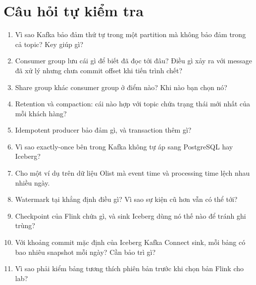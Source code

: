 \section{Câu hỏi tự kiểm tra}
\begin{enumerate}
  \item Vì sao Kafka bảo đảm thứ tự trong một partition mà không bảo đảm trong cả topic? Key giúp gì?
  \item Consumer group lưu cái gì để biết đã đọc tới đâu? Điều gì xảy ra với message đã xử lý nhưng chưa commit offset khi tiến trình chết?
  \item Share group khác consumer group ở điểm nào? Khi nào bạn chọn nó?
  \item Retention và compaction: cái nào hợp với topic chứa trạng thái mới nhất của mỗi khách hàng?
  \item Idempotent producer bảo đảm gì, và transaction thêm gì?
  \item Vì sao exactly-once bên trong Kafka không tự áp sang PostgreSQL hay Iceberg?
  \item Cho một ví dụ trên dữ liệu Olist mà event time và processing time lệch nhau nhiều ngày.
  \item Watermark tại  khẳng định điều gì? Vì sao sự kiện cũ hơn vẫn có thể tới?
  \item Checkpoint của Flink chứa gì, và sink Iceberg dùng nó thế nào để tránh ghi trùng?
  \item Với khoảng commit mặc định của Iceberg Kafka Connect sink, mỗi bảng có bao nhiêu snapshot mỗi ngày? Cần bảo trì gì?
  \item Vì sao phải kiểm bảng tương thích phiên bản trước khi chọn bản Flink cho lab?
\end{enumerate}

